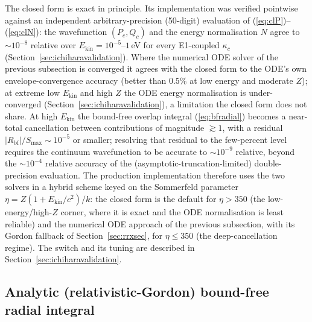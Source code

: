 \documentclass[11pt,a4paper]{article}
\begin{document}
The closed form is exact in principle.  Its implementation was verified
pointwise against an independent arbitrary-precision (50-digit) evaluation
of (\ref{eq:clP})--(\ref{eq:clN}): the wavefunction $(P_c,Q_c)$ and the
energy normalisation $N$ agree to $\sim10^{-8}$ relative over
$E_{\mathrm{kin}}=10^{-5}$--$1$\,eV for every E1-coupled $\kappa_c$
(Section~\ref{sec:ichiharavalidation}).  Where the numerical ODE solver of
the previous subsection is converged it agrees with the closed form to the
ODE's own envelope-convergence accuracy (better than $0.5\%$ at low energy
and moderate $Z$); at extreme low $E_{\mathrm{kin}}$ and high $Z$ the ODE
energy normalisation is under-converged (Section~\ref{sec:ichiharavalidation}),
a limitation the closed form does not share.  At high $E_{\mathrm{kin}}$
the bound-free overlap integral
(\ref{eq:bfradial}) becomes a near-total cancellation between contributions
of magnitude $\gtrsim1$, with a residual
$|R_{\mathrm{bf}}|/S_{\max}\sim10^{-5}$ or smaller; resolving that residual
to the few-percent level requires the continuum wavefunction to be accurate
to $\sim10^{-9}$ relative, beyond the $\sim10^{-4}$ relative accuracy of the
(asymptotic-truncation-limited) double-precision evaluation.  The production
implementation therefore uses the two solvers in a hybrid scheme keyed on
the Sommerfeld parameter $\eta=Z(1+E_{\mathrm{kin}}/c^{2})/k$: the closed
form is the default for $\eta>350$ (the low-energy/high-$Z$ corner, where
it is exact and the ODE normalisation is least reliable) and the numerical
ODE approach of the previous subsection, with its Gordon fallback of
Section~\ref{sec:rrxsec}, for $\eta\le350$ (the deep-cancellation regime).
The switch and its tuning are described in
Section~\ref{sec:ichiharavalidation}.

\subsection{Analytic (relativistic-Gordon) bound-free radial integral}
\label{sec:bfanalytic}
\end{document}
